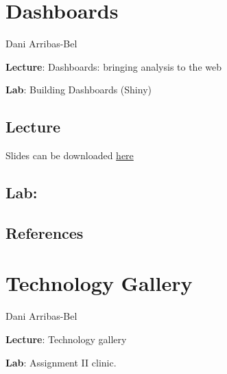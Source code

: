 \documentclass[
  letterpaper,
  DIV=11,
  numbers=noendperiod]{scrreprt}
\begin{document}

\hypertarget{dashboards}{%
\chapter{Dashboards}\label{dashboards}}

Dani Arribas-Bel

\textbf{Lecture}: Dashboards: bringing analysis to the web

\textbf{Lab}: Building Dashboards (Shiny)

\hypertarget{lecture-7}{%
\section{Lecture}\label{lecture-7}}

Slides can be downloaded
\href{https://github.com/GDSL-UL/wma/raw/main/pdf/lecture_08.pdf}{here}

\hypertarget{lab-2}{%
\section{Lab:}\label{lab-2}}

\hypertarget{references-7}{%
\section{References}\label{references-7}}


\hypertarget{technology-gallery}{%
\chapter{Technology Gallery}\label{technology-gallery}}

Dani Arribas-Bel

\textbf{Lecture}: Technology gallery

\textbf{Lab}: Assignment II clinic.
\end{document}
